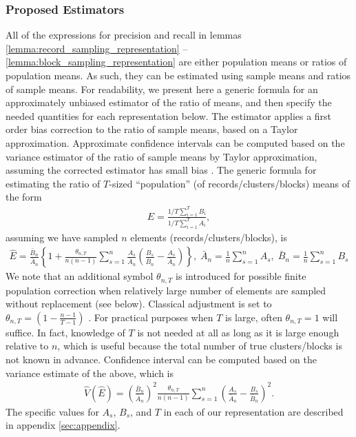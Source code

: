 \documentclass[fontsize=11pt]{article}
\theoremstyle{definition}
\begin{document}
\subsubsection{Proposed Estimators}

All of the expressions for precision and recall in lemmas \ref{lemma:record_sampling_representation} -- \ref{lemma:block_sampling_representation} are either population means or ratios of population means. As such, they can be estimated using sample means and ratios of sample means. For readability, we present here a generic formula for an approximately unbiased estimator of the ratio of means, and then specify the needed quantities for each representation below. The estimator applies a first order bias correction to the ratio of sample means, based on a Taylor approximation. Approximate confidence intervals can be computed based on the variance estimator of the ratio of sample means by Taylor approximation, assuming the corrected estimator has small bias \citep{fuller2011sampling}. The generic formula for estimating the ratio of $T$-sized ``population'' (of records/clusters/blocks) means of the form
\begin{align}
    E=\frac{1/T\sum_{i=1}^{T} B_i}{1/T\sum_{i=1}^T A_i},
\end{align}
assuming we have sampled $n$ elements (records/clusters/blocks), is
\begin{align}\label{eq:bias_adjustment}
    \widehat{E} = \frac{\bar{B}_n}{\bar{A}_n} \left\{ 1 + \frac{\theta_{n,T}}{n(n-1)} \sum_{s=1}^n \frac{A_s}{\bar{A}_n} \left(\frac{B_s}{\bar{B}_n} - \frac{A_s}{\bar{A}_n} \right) \right\}, \; \bar{A}_n = \frac{1}{n} \sum_{s=1}^{n} A_s, \; \bar{B}_n = \frac{1}{n} \sum_{s=1}^{n} B_s
\end{align}
We note that an additional symbol $\theta_{n,T}$ is introduced for possible finite population correction when relatively large number of elements are sampled without replacement (see below). Classical adjustment is set to $\theta_{n,T} = (1 - \frac{n-1}{T-1})$ \citep{Cochran1977}. For practical purposes when $T$ is large, often $\theta_{n,T}=1$ will suffice. In fact, knowledge of $T$ is not needed at all as long as it is large enough relative to $n$, which is useful because the total number of true clusters/blocks is not known in advance. Confidence interval can be computed based on the variance estimate of the above, which is
\begin{align} \label{eq:estimated_variance}
    \widehat{V}(\widehat{E}) = \left( \frac{\bar{B}_n}{\bar{A}_n} \right)^2 \frac{\theta_{n,T}}{n(n-1)} \sum_{s=1}^n \left( \frac{A_s}{\bar{A}_n} - \frac{B_s}{\bar{B}_n}\right)^2.
\end{align}
The specific values for $A_s$, $B_s$, and $T$ in each of our representation are described in appendix \ref{sec:appendix}.
\end{document}
